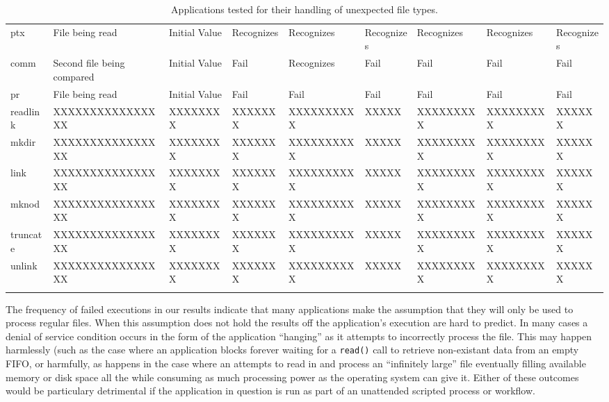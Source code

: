 \begin{table}[t]
\begin{tabular}{l  l  |  l  l  l  l  l  l  l}
        ptx         & File being read            & Initial Value  & Recognizes     & Recognizes  & Recognizes & Recognizes  & Recognizes & Recognizes\\
        comm        & Second file being compared & Initial Value  & Fail           & Recognizes  & Fail       & Fail        & Fail       & Fail\\
        pr          & File being read            & Initial Value  & Fail           & Fail        & Fail       & Fail        & Fail       & Fail\\
        readlink    & XXXXXXXXXXXXXXXX           & XXXXXXXX       & XXXXXXX        & XXXXXXXXXX  & XXXXX      & XXXXXXXXX   & XXXXXXXXX  & XXXXXX\\
        mkdir       & XXXXXXXXXXXXXXXX           & XXXXXXXX       & XXXXXXX        & XXXXXXXXXX  & XXXXX      & XXXXXXXXX   & XXXXXXXXX  & XXXXXX\\
        link        & XXXXXXXXXXXXXXXX           & XXXXXXXX       & XXXXXXX        & XXXXXXXXXX  & XXXXX      & XXXXXXXXX   & XXXXXXXXX  & XXXXXX\\
        mknod       & XXXXXXXXXXXXXXXX           & XXXXXXXX       & XXXXXXX        & XXXXXXXXXX  & XXXXX      & XXXXXXXXX   & XXXXXXXXX  & XXXXXX\\
        truncate    & XXXXXXXXXXXXXXXX           & XXXXXXXX       & XXXXXXX        & XXXXXXXXXX  & XXXXX      & XXXXXXXXX   & XXXXXXXXX  & XXXXXX\\
        unlink      & XXXXXXXXXXXXXXXX           & XXXXXXXX       & XXXXXXX        & XXXXXXXXXX  & XXXXX      & XXXXXXXXX   & XXXXXXXXX  & XXXXXX\\
    \bottomrule{}
    \end{tabular}
    \caption{Applications tested for their handling of unexpected file types.}
    \label{table:unexpectedtypes}
\end{table}

The frequency of failed executions in our results indicate that many
applications make the assumption that they will only be used to process
regular files.  When this assumption does not hold the results off the
application's execution are hard to predict.  In many cases a denial of
service condition occurs in the form of the application ``hanging'' as it
attempts to incorrectly process the file.  This may happen harmlessly (such
as the case where an application blocks forever waiting for a {\tt read()}
call to retrieve non-existant data from an empty FIFO, or harmfully, as
happens in the case where an attempts to read in and process an
``infinitely large'' file eventually filling available memory or disk
space all the while consuming as much processing power as the operating
system can give it.  Either of these outcomes would be particulary
detrimental if the application in question is run as part of an unattended
scripted process or workflow.

